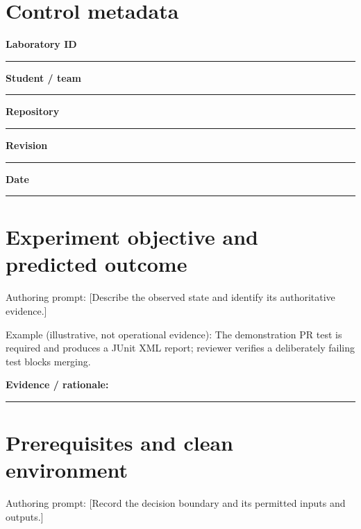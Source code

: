 \documentclass[11pt,letterpaper]{article}
\begin{document}
\makedoctitle\makedocsummary
\section{Control metadata}
\noindent\textbf{Laboratory ID}\par\nobreak\vspace{6pt}\noindent\rule{0.93\linewidth}{0.4pt}\par\vspace{14pt}
\noindent\textbf{Student / team}\par\nobreak\vspace{6pt}\noindent\rule{0.93\linewidth}{0.4pt}\par\vspace{14pt}
\noindent\textbf{Repository}\par\nobreak\vspace{6pt}\noindent\rule{0.93\linewidth}{0.4pt}\par\vspace{14pt}
\noindent\textbf{Revision}\par\nobreak\vspace{6pt}\noindent\rule{0.93\linewidth}{0.4pt}\par\vspace{14pt}
\noindent\textbf{Date}\par\nobreak\vspace{6pt}\noindent\rule{0.93\linewidth}{0.4pt}\par\vspace{14pt}
\section{Experiment objective and predicted outcome}
Authoring prompt: [Describe the observed state and identify its authoritative evidence.]

Example (illustrative, not operational evidence): The demonstration PR test is required and produces a JUnit XML report; reviewer verifies a deliberately failing test blocks merging.

\noindent\textbf{Evidence / rationale:}\par\nobreak\vspace{8pt}\noindent\rule{0.93\linewidth}{0.4pt}\par\vspace{14pt}
\section{Prerequisites and clean environment}
Authoring prompt: [Record the decision boundary and its permitted inputs and outputs.]
\end{document}
